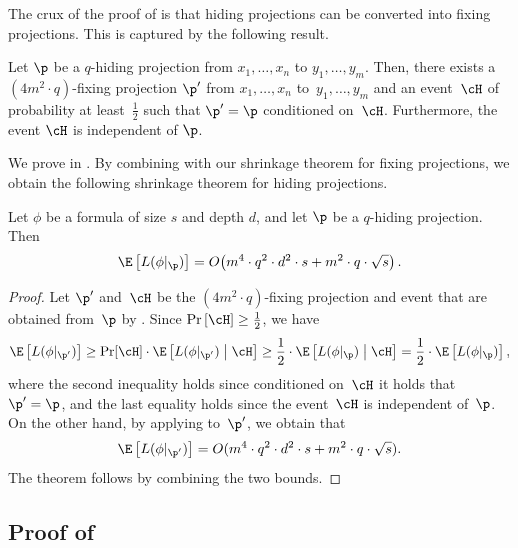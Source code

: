The crux of the proof of  is that hiding projections
can be converted into fixing projections. This is captured by the
following result. 
\begin{lemma}
\label{lemma:hiding-to-fixing}Let $\p$ be a $q$-hiding projection from
$x_{1},\ldots,x_{n}$ to $y_{1},\ldots,y_{m}$. Then, there exists
a $(4m^{2}\cdot q)$-fixing projection $\p'$ from $x_{1},\ldots,x_{n}$
to~$y_{1},\ldots,y_{m}$ and an event~$\cH$ of probability at least~$\frac{1}{2}$
such that $\p'=\p$ conditioned on~$\cH$. Furthermore, the event
$\cH$ is independent of $\p$.
\end{lemma}

We prove  in .
By combining  with our shrinkage theorem for
fixing projections, we obtain the following shrinkage theorem for
hiding projections. 
\begin{restated}{}
Let $\phi$ be a formula of size $s$ and depth $d$, and let $\p$
be a $q$-hiding projection. Then 
\[
\E\left[L(\phi|_{\p})\right]=O\!\left(m^{4}\cdot q^{2}\cdot d^{2}\cdot s+m^{2}\cdot q\cdot\sqrt{s}\right).
\]
\end{restated}

\begin{proof}
Let $\p'$ and~$\cH$ be the $(4m^{2}\cdot q)$-fixing projection
and event that are obtained from~$\p$ by .
Since $\Pr\left[\cH\right]\geq\frac{1}{2}$, we have 
\[
\E\left[L(\phi|_{\p'})\right]\geq\Pr\!\left[\cH\right]\cdot\E\left[L(\phi|_{\p'})\;\middle|\;\cH\right]\geq\frac{1}{2}\cdot\E\left[L(\phi|_{\p})\;\middle|\;\cH\right]=\frac{1}{2}\cdot\E\left[L(\phi|_{\p})\right],
\]
where the second inequality holds since conditioned on~$\cH$ it
holds that $\p'=\p$, and the last equality holds since the event~$\cH$
is independent of~$\p$. On the other hand, by applying 
to~$\p'$, we obtain that 
\[
\E\left[L(\phi|_{\p'})\right]=O(m^{4}\cdot q^{2}\cdot d^{2}\cdot s+m^{2}\cdot q\cdot\sqrt{s}).
\]
The theorem follows by combining the two bounds. 
\end{proof}

\subsection{\label{subsec:hiding-to-fixing}Proof of }

